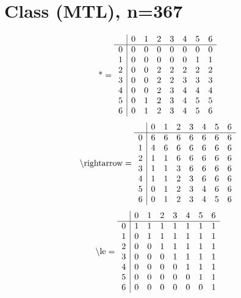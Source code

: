 \documentclass[11pt]{article}
\begin{document}
\section{Class (MTL), n=367}
\[\text{*} = 
\begin{array}{r | r r r r r r r}
 & 0 & 1 & 2 & 3 & 4 & 5 & 6 \\ \hline
0 & 0 & 0 & 0 & 0 & 0 & 0 & 0 \\
1 & 0 & 0 & 0 & 0 & 0 & 1 & 1 \\
2 & 0 & 0 & 2 & 2 & 2 & 2 & 2 \\
3 & 0 & 0 & 2 & 2 & 3 & 3 & 3 \\
4 & 0 & 0 & 2 & 3 & 4 & 4 & 4 \\
5 & 0 & 1 & 2 & 3 & 4 & 5 & 5 \\
6 & 0 & 1 & 2 & 3 & 4 & 5 & 6 \\
\end{array}
\]
\[\text{\textbackslash rightarrow} = 
\begin{array}{r | r r r r r r r}
 & 0 & 1 & 2 & 3 & 4 & 5 & 6 \\ \hline
0 & 6 & 6 & 6 & 6 & 6 & 6 & 6 \\
1 & 4 & 6 & 6 & 6 & 6 & 6 & 6 \\
2 & 1 & 1 & 6 & 6 & 6 & 6 & 6 \\
3 & 1 & 1 & 3 & 6 & 6 & 6 & 6 \\
4 & 1 & 1 & 2 & 3 & 6 & 6 & 6 \\
5 & 0 & 1 & 2 & 3 & 4 & 6 & 6 \\
6 & 0 & 1 & 2 & 3 & 4 & 5 & 6 \\
\end{array}
\]
\[\text{\textbackslash le} = 
\begin{array}{r | r r r r r r r}
 & 0 & 1 & 2 & 3 & 4 & 5 & 6 \\ \hline
0 & 1 & 1 & 1 & 1 & 1 & 1 & 1 \\
1 & 0 & 1 & 1 & 1 & 1 & 1 & 1 \\
2 & 0 & 0 & 1 & 1 & 1 & 1 & 1 \\
3 & 0 & 0 & 0 & 1 & 1 & 1 & 1 \\
4 & 0 & 0 & 0 & 0 & 1 & 1 & 1 \\
5 & 0 & 0 & 0 & 0 & 0 & 1 & 1 \\
6 & 0 & 0 & 0 & 0 & 0 & 0 & 1 \\
\end{array}
\]
\end{document}
